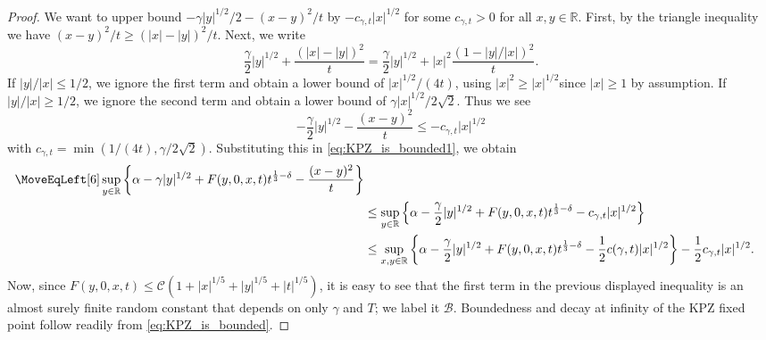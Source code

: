 \documentclass[oneside,final,11pt]{amsart}
\theoremstyle{definition}
\newcounter{assum}
\newcommand{\R}{\mathbb{R}}
\newcommand{\CC}{\mathcal{C}}
\newcommand{\CB}{\mathcal{B}}
\newcommand{\CD}{\mathcal{D}}
\newcommand{\1}[1]{\mathbf{1}_{#1}}
\newcommand{\kmtext}[1]{{\color{red}[KM:#1]}}
\newcommand{\mhtext}[1]{{\color{green!65!black}[MH: #1]}}
\numberwithin{equation}{section}
\begin{document}
\begin{proof}
We want to upper bound $-\gamma |y|^{1/2}/2 - (x-y)^2/t$ by $-c_{\gamma,t} |x|^{1/2}$ for some $c_{\gamma,t}>0$ for all $x, y \in \R$. First, by the triangle inequality we have $(x-y)^2/t \geq (|x|-|y|)^2/t$. Next, we write 
%
$$\frac{\gamma}{2}|y|^{1/2}+\frac{(|x|-|y|)^2}{t} = \frac{\gamma}{2}|y|^{1/2}+|x|^2\frac{(1-|y|/|x|)^2}{t}.$$
%
If $|y|/|x| \leq 1/2$, we ignore the first term and obtain a lower bound of $|x|^{1/2}/(4t)$, using $|x|^2\geq |x|^{1/2}$since $|x|\geq 1$ by assumption. If $|y|/|x|\geq 1/2$, we ignore the second term and obtain a lower bound of $\gamma |x|^{1/2}/2\sqrt{2}$. Thus we see
%
$$-\frac{\gamma}{2} |y|^{1/2} - \frac{(x-y)^2}{t} \leq -c_{\gamma,t}|x|^{1/2}$$
%
with $c_{\gamma,t} = \min(1/(4t), \gamma/2\sqrt{2})$. Substituting this in \eqref{eq:KPZ_is_bounded1}, we obtain
%
\begin{align*}
\MoveEqLeft[6]
\sup_{y\in\R}\left\{\alpha - \gamma |y|^{1/2} + F(y, 0, x, t) t^{\frac{1}{3} - \delta} - \frac{(x-y)^2}{t}\right\}\\
%
&\leq \sup_{y\in\R}\left\{\alpha - \frac{\gamma}{2}|y|^{1/2}+F(y, 0, x, t)t^{\frac{1}{3} - \delta} - c_{\gamma,t}|x|^{1/2}\right\}\\
%
&\leq \sup_{x, y\in\R}\left\{\alpha - \frac{\gamma}{2}|y|^{1/2}+F(y, 0, x, t)t^{\frac{1}{3} - \delta} - \frac{1}{2}c(\gamma,t)|x|^{1/2}\right\} - \frac{1}{2}c_{\gamma,t}|x|^{1/2}.
\end{align*}
%
Now, since $F(y, 0, x, t) \leq \CC(1+|x|^{1/5}+|y|^{1/5} + |t|^{1/5})$, it is easy to see that the first term in the previous displayed inequality is an almost surely finite random constant that depends on only $\gamma$ and $T$; we label it $\CB$. Boundedness and decay at infinity of the KPZ fixed point follow readily from \eqref{eq:KPZ_is_bounded}.

\end{proof}
\end{document}
